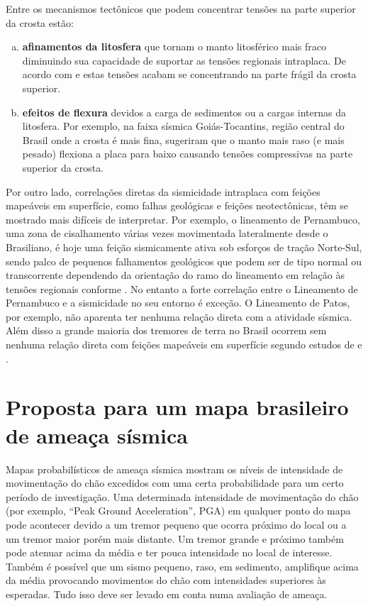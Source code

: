 \documentclass[jgrga]{agutex}
\begin{document}
\begin{article}
Entre os mecanismos tectônicos que podem concentrar tensões na parte superior da crosta estão:

\begin{enumerate}[a)]
	\item \textbf{afinamentos da litosfera} que tornam o manto litosférico mais fraco diminuindo sua capacidade de suportar as tensões regionais intraplaca. De acordo com \citet{assumpcao_2004} e \citet{azevedo_etal_2015} estas tensões acabam se concentrando na parte frágil da crosta superior. 

	\item \textbf{efeitos de flexura} devidos a carga de sedimentos ou a cargas internas da litosfera. Por exemplo, na faixa sísmica Goiás-Tocantins, região central do Brasil onde a crosta é mais fina, \citet{assumpcao_sacek_2013} sugeriram que o manto mais raso (e mais pesado) flexiona a placa para baixo causando tensões compressivas na parte superior da crosta. 
\end{enumerate}

Por outro lado, correlações diretas da sismicidade intraplaca com feições mapeáveis em superfície, como falhas geológicas e feições neotectônicas, têm se mostrado mais difíceis de interpretar. Por exemplo, o lineamento de Pernambuco, uma zona de cisalhamento várias vezes movimentada lateralmente desde o Brasiliano, é hoje uma feição sismicamente ativa sob esforços de tração Norte-Sul, sendo palco de pequenos falhamentos geológicos que podem ser de tipo normal ou transcorrente dependendo da orientação do ramo do lineamento em relação às tensões regionais conforme \citet{limaneto_etal_2013,limaneto_etal_2014}. No entanto a forte correlação entre o Lineamento de Pernambuco e a sismicidade no seu entorno é exceção. O Lineamento de Patos, por exemplo, não aparenta ter nenhuma relação direta com a atividade sísmica. Além disso a grande maioria dos tremores de terra no Brasil ocorrem sem nenhuma relação direta com feições mapeáveis em superfície segundo estudos de \citet{assumpcao_et_al_2014} e \citet{oliveira_etal_2015}.

\section{Proposta para um mapa brasileiro de ameaça sísmica}

Mapas probabilísticos de ameaça sísmica mostram os níveis de intensidade de movimentação do chão excedidos com uma certa probabilidade para um certo período de investigação.  Uma determinada intensidade de movimentação do chão (por exemplo, ``Peak Ground Acceleration'', PGA) em qualquer ponto do mapa pode acontecer devido a um tremor pequeno que ocorra próximo do local ou a um tremor maior porém mais distante. Um tremor grande e próximo também pode atenuar acima da média e ter pouca intensidade no local de interesse. Também é possível que um sismo pequeno, raso, em sedimento, amplifique acima da média provocando movimentos do chão com intensidades superiores às esperadas. Tudo isso deve ser levado em conta numa avaliação de ameaça.


\end{article}
\end{document}
